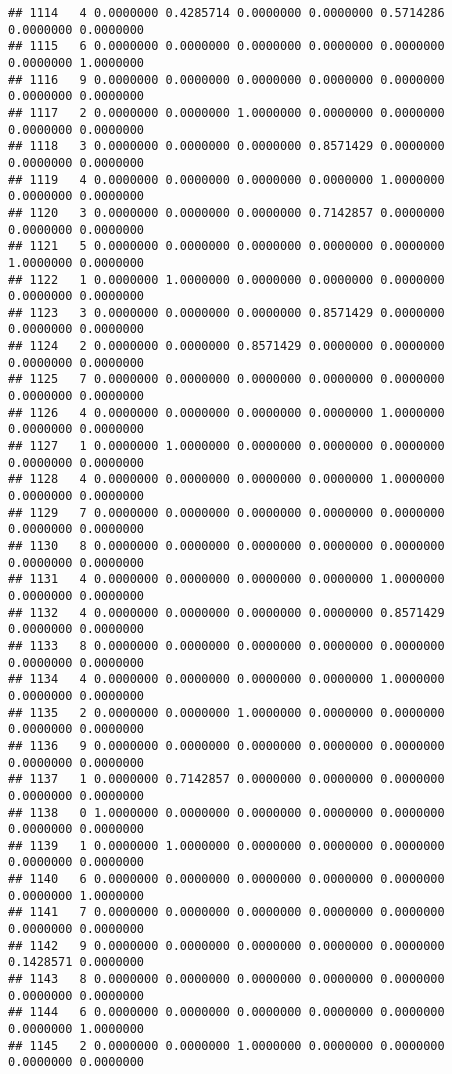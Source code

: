 \documentclass[
]{article}
\begin{document}
\begin{verbatim}
## 1114   4 0.0000000 0.4285714 0.0000000 0.0000000 0.5714286 0.0000000 0.0000000
## 1115   6 0.0000000 0.0000000 0.0000000 0.0000000 0.0000000 0.0000000 1.0000000
## 1116   9 0.0000000 0.0000000 0.0000000 0.0000000 0.0000000 0.0000000 0.0000000
## 1117   2 0.0000000 0.0000000 1.0000000 0.0000000 0.0000000 0.0000000 0.0000000
## 1118   3 0.0000000 0.0000000 0.0000000 0.8571429 0.0000000 0.0000000 0.0000000
## 1119   4 0.0000000 0.0000000 0.0000000 0.0000000 1.0000000 0.0000000 0.0000000
## 1120   3 0.0000000 0.0000000 0.0000000 0.7142857 0.0000000 0.0000000 0.0000000
## 1121   5 0.0000000 0.0000000 0.0000000 0.0000000 0.0000000 1.0000000 0.0000000
## 1122   1 0.0000000 1.0000000 0.0000000 0.0000000 0.0000000 0.0000000 0.0000000
## 1123   3 0.0000000 0.0000000 0.0000000 0.8571429 0.0000000 0.0000000 0.0000000
## 1124   2 0.0000000 0.0000000 0.8571429 0.0000000 0.0000000 0.0000000 0.0000000
## 1125   7 0.0000000 0.0000000 0.0000000 0.0000000 0.0000000 0.0000000 0.0000000
## 1126   4 0.0000000 0.0000000 0.0000000 0.0000000 1.0000000 0.0000000 0.0000000
## 1127   1 0.0000000 1.0000000 0.0000000 0.0000000 0.0000000 0.0000000 0.0000000
## 1128   4 0.0000000 0.0000000 0.0000000 0.0000000 1.0000000 0.0000000 0.0000000
## 1129   7 0.0000000 0.0000000 0.0000000 0.0000000 0.0000000 0.0000000 0.0000000
## 1130   8 0.0000000 0.0000000 0.0000000 0.0000000 0.0000000 0.0000000 0.0000000
## 1131   4 0.0000000 0.0000000 0.0000000 0.0000000 1.0000000 0.0000000 0.0000000
## 1132   4 0.0000000 0.0000000 0.0000000 0.0000000 0.8571429 0.0000000 0.0000000
## 1133   8 0.0000000 0.0000000 0.0000000 0.0000000 0.0000000 0.0000000 0.0000000
## 1134   4 0.0000000 0.0000000 0.0000000 0.0000000 1.0000000 0.0000000 0.0000000
## 1135   2 0.0000000 0.0000000 1.0000000 0.0000000 0.0000000 0.0000000 0.0000000
## 1136   9 0.0000000 0.0000000 0.0000000 0.0000000 0.0000000 0.0000000 0.0000000
## 1137   1 0.0000000 0.7142857 0.0000000 0.0000000 0.0000000 0.0000000 0.0000000
## 1138   0 1.0000000 0.0000000 0.0000000 0.0000000 0.0000000 0.0000000 0.0000000
## 1139   1 0.0000000 1.0000000 0.0000000 0.0000000 0.0000000 0.0000000 0.0000000
## 1140   6 0.0000000 0.0000000 0.0000000 0.0000000 0.0000000 0.0000000 1.0000000
## 1141   7 0.0000000 0.0000000 0.0000000 0.0000000 0.0000000 0.0000000 0.0000000
## 1142   9 0.0000000 0.0000000 0.0000000 0.0000000 0.0000000 0.1428571 0.0000000
## 1143   8 0.0000000 0.0000000 0.0000000 0.0000000 0.0000000 0.0000000 0.0000000
## 1144   6 0.0000000 0.0000000 0.0000000 0.0000000 0.0000000 0.0000000 1.0000000
## 1145   2 0.0000000 0.0000000 1.0000000 0.0000000 0.0000000 0.0000000 0.0000000

\end{verbatim}
\end{document}
